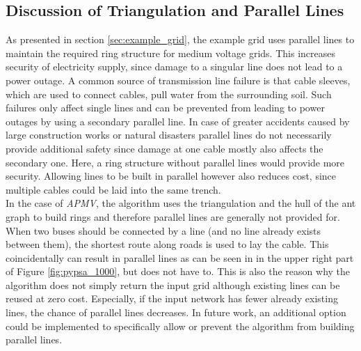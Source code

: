 \subsection{Discussion of Triangulation and Parallel Lines}\label{sec:discussion}
As presented in section \ref{sec:example_grid}, the example grid uses parallel lines to maintain the required ring structure for medium voltage grids. This increases security of electricity supply, since damage to a singular line does not lead to a power outage. A common source of transmission line failure is that cable sleeves, which are used to connect cables, pull water from the surrounding soil. Such failures only affect single lines and can be prevented from leading to power outages by using a secondary parallel line. In case of greater accidents caused by large construction works or natural disasters parallel lines do not necessarily provide additional safety since damage at one cable mostly also affects the secondary one. Here, a ring structure without parallel lines would provide more security. Allowing lines to be built in parallel however also reduces cost, since multiple cables could be laid into the same trench. \\
In the case of \textit{APMV}, the algorithm uses the triangulation and the hull of the ant graph to build rings and therefore parallel lines are generally not provided for. When two buses should be connected by a line (and no line already exists between them), the shortest route along roads is used to lay the cable. This coincidentally can result in parallel lines as can be seen in in the upper right part of Figure \ref{fig:pypsa_1000}, but does not have to. This is also the reason why the algorithm does not simply return the input grid although existing lines can be reused at zero cost. Especially, if the input network has fewer already existing lines, the chance of parallel lines decreases. In future work, an additional option could be implemented to specifically allow or prevent the algorithm from building parallel lines.
	
	
	
	
	
	
	
	
	
	
	
	
	
	